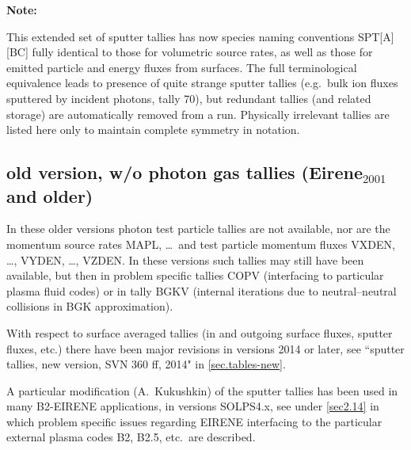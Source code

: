 \begin{landscape}
  \textbf{Note:}

  This extended set of sputter tallies has now species naming conventions
  SPT[A][BC] fully identical to those for volumetric source rates, as well as
  those for emitted particle and energy fluxes from surfaces.
  The full terminological equivalence leads to presence of quite strange sputter
  tallies (e.g.\ bulk ion fluxes sputtered by incident photons, tally 70), but
  redundant tallies (and related storage) are automatically removed from a run.
  Physically irrelevant tallies are listed here only to maintain complete
  symmetry in notation.
\end{landscape}

\newpage

\subsection{old version, w/o photon gas tallies (Eirene\texorpdfstring{$_{2001}
    $}{2001} and older)}\label{sec.tables-old}

In these older versions photon test particle tallies are not available, nor are
the momentum source rates MAPL, \dots\ and test particle momentum fluxes VXDEN,
\dots, VYDEN, \dots, VZDEN.
In these versions such tallies may still have been available, but then in
problem specific tallies COPV (interfacing to particular plasma fluid codes) or
in tally BGKV (internal iterations due to neutral--neutral collisions in
\ac{BGK} approximation).

\medskip

With respect to surface averaged tallies (in and outgoing surface fluxes,
sputter fluxes, etc.) there have been major revisions in versions 2014 or
later, see ``sputter tallies, new version, SVN 360 ff, 2014" in
\cref{sec.tables-new}.

A particular modification (A.~Kukushkin) of the sputter tallies has been used
in many B2-EIRENE applications, in versions SOLPS4.x, see under \cref{sec2.14}
in which problem specific issues regarding EIRENE interfacing to the particular
external plasma codes B2, B2.5, etc.\ are described.

